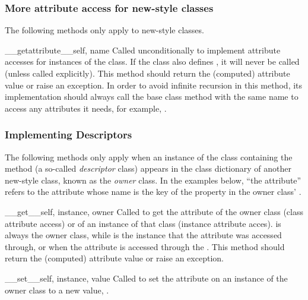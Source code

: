 \subsubsection{More attribute access for new-style classes \label{new-style-attribute-access}}

The following methods only apply to new-style classes.

\begin{methoddesc}[object]{__getattribute__}{self, name}
Called unconditionally to implement attribute accesses for instances
of the class. If the class also defines , it will
never be called (unless called explicitly).
This method should return the (computed) attribute
value or raise an  exception.
In order to avoid infinite recursion in this method, its
implementation should always call the base class method with the same
name to access any attributes it needs, for example,
.
\end{methoddesc}

\subsubsection{Implementing Descriptors \label{descriptors}}

The following methods only apply when an instance of the class
containing the method (a so-called \emph{descriptor} class) appears in
the class dictionary of another new-style class, known as the
\emph{owner} class. In the examples below, ``the attribute'' refers to
the attribute whose name is the key of the property in the owner
class' .

\begin{methoddesc}[object]{__get__}{self, instance, owner}
Called to get the attribute of the owner class (class attribute access)
or of an instance of that class (instance attribute acces).
 is always the owner class, while  is the
instance that the attribute was accessed through, or  when
the attribute is accessed through the .  This method should
return the (computed) attribute value or raise an
 exception.
\end{methoddesc}

\begin{methoddesc}[object]{__set__}{self, instance, value}
Called to set the attribute on an instance  of the owner
class to a new value, .
\end{methoddesc}

